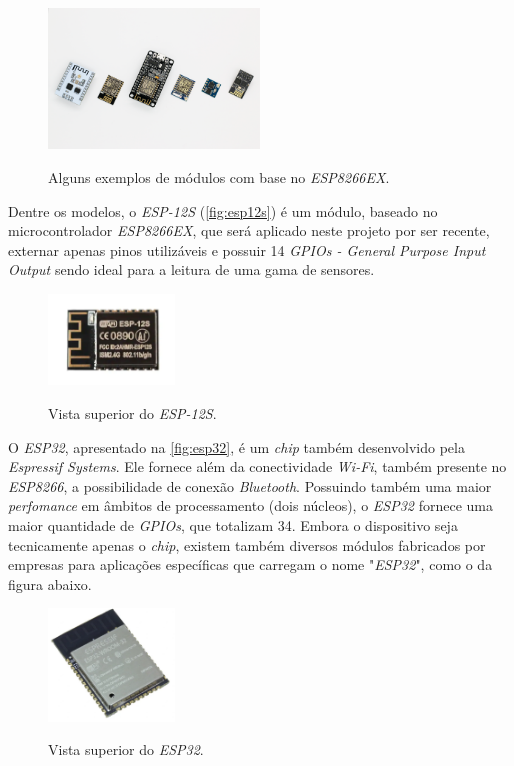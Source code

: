 \begin{figure}[H]
	\centering
	\caption{Alguns exemplos de módulos com base no \textit{ESP8266EX}.}
	\includegraphics[width=0.5\textwidth]{figuras/modulos_esp8266.png}
	\label{fig:modulos_esp8266}
\end{figure} 

Dentre os modelos, o \textit{ESP-12S} (\autoref{fig:esp12s}) é um módulo, baseado no microcontrolador \textit{ESP8266EX}, que será aplicado neste projeto por ser recente, externar apenas pinos utilizáveis e possuir 14 \textit{GPIOs - General Purpose Input Output} sendo ideal para a leitura de uma gama de sensores.


\begin{figure}[H]
	\centering
	\caption{Vista superior do \textit{ESP-12S}.}
	\includegraphics[width=0.3\textwidth]{figuras/ESP-12S.png}
	\label{fig:esp12s}
\end{figure} 



O \textit{ESP32}, apresentado na \autoref{fig:esp32}, é um \textit{chip} também desenvolvido pela \textit{Espressif Systems}. Ele fornece além da conectividade \textit{Wi-Fi}, também presente no \textit{ESP8266}, a possibilidade de conexão \textit{Bluetooth}. Possuindo também uma maior \textit{perfomance} em âmbitos de processamento (dois núcleos), o \textit{ESP32} fornece uma maior quantidade de \textit{GPIOs}, que totalizam 34.  Embora o dispositivo seja tecnicamente apenas o \textit{chip}, existem também diversos módulos fabricados por empresas para aplicações específicas que carregam o nome "\textit{ESP32}", como o da figura abaixo.

\begin{figure}[H]
	\centering
	\caption{Vista superior do \textit{ESP32}.}
	\includegraphics[width=0.3\textwidth]{figuras/ESP32.png}
	\label{fig:esp32}
\end{figure} 

